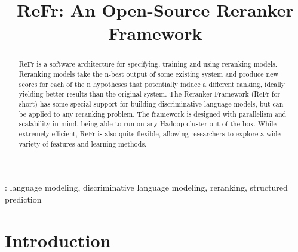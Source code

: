 \documentclass[a4paper]{article}
\title{ReFr: An Open-Source Reranker Framework}
\begin{document}
\maketitle
%
\begin{abstract}

ReFr is a software architecture for specifying, training and using
reranking models. Reranking models take the n-best output of some
existing system and produce new scores for each of the n hypotheses
that potentially induce a different ranking, ideally yielding better
results than the original system. The Reranker Framework (ReFr for
short) has some special support for building discriminative language
models, but can be applied to any reranking problem.  The framework is
designed with parallelism and scalability in mind, being able to run
on any Hadoop cluster out of the box.  While extremely efficient, ReFr
is also quite flexible, allowing researchers to explore a wide variety
of features and learning methods.



\end{abstract}
: language modeling, discriminative language modeling, reranking, structured prediction



%
\section{Introduction}
\end{document}
